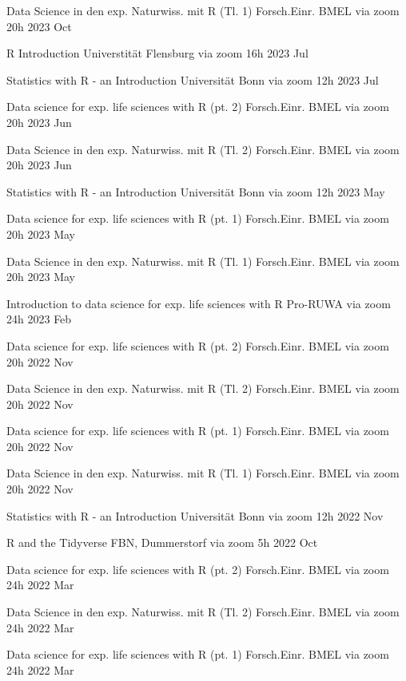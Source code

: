 \documentclass[11pt,a4paper,]{awesome-cv}
\begin{document}
\begin{cvhonors}
\cvhonor
{Data Science in den exp. Naturwiss. mit R (Tl. 1)  }
{Forsch.Einr. BMEL via zoom}
{20h}
{2023 Oct  }

\cvhonor
{R Introduction  }
{Universtität Flensburg via zoom}
{16h}
{2023 Jul  }

\cvhonor
{Statistics with R - an Introduction  }
{Universität Bonn via zoom}
{12h}
{2023 Jul  }

\cvhonor
{Data science for exp. life sciences with R (pt. 2)  }
{Forsch.Einr. BMEL via zoom}
{20h}
{2023 Jun  }

\cvhonor
{Data Science in den exp. Naturwiss. mit R (Tl. 2)  }
{Forsch.Einr. BMEL via zoom}
{20h}
{2023 Jun  }

\cvhonor
{Statistics with R - an Introduction  }
{Universität Bonn via zoom}
{12h}
{2023 May  }

\cvhonor
{Data science for exp. life sciences with R (pt. 1)  }
{Forsch.Einr. BMEL via zoom}
{20h}
{2023 May  }

\cvhonor
{Data Science in den exp. Naturwiss. mit R (Tl. 1)  }
{Forsch.Einr. BMEL via zoom}
{20h}
{2023 May  }

\cvhonor
{Introduction to data science for exp. life sciences with R  }
{Pro-RUWA via zoom}
{24h}
{2023 Feb  }

\cvhonor
{Data science for exp. life sciences with R (pt. 2)  }
{Forsch.Einr. BMEL via zoom}
{20h}
{2022 Nov  }

\cvhonor
{Data Science in den exp. Naturwiss. mit R (Tl. 2)  }
{Forsch.Einr. BMEL via zoom}
{20h}
{2022 Nov  }

\cvhonor
{Data science for exp. life sciences with R (pt. 1)  }
{Forsch.Einr. BMEL via zoom}
{20h}
{2022 Nov  }

\cvhonor
{Data Science in den exp. Naturwiss. mit R (Tl. 1)  }
{Forsch.Einr. BMEL via zoom}
{20h}
{2022 Nov  }

\cvhonor
{Statistics with R - an Introduction  }
{Universität Bonn via zoom}
{12h}
{2022 Nov  }

\cvhonor
{R and the {Tidyverse}  }
{FBN, Dummerstorf via zoom}
{5h}
{2022 Oct  }

\cvhonor
{Data science for exp. life sciences with R (pt. 2)  }
{Forsch.Einr. BMEL via zoom}
{24h}
{2022 Mar  }

\cvhonor
{Data Science in den exp. Naturwiss. mit R (Tl. 2)  }
{Forsch.Einr. BMEL via zoom}
{24h}
{2022 Mar  }

\cvhonor
{Data science for exp. life sciences with R (pt. 1)  }
{Forsch.Einr. BMEL via zoom}
{24h}
{2022 Mar  }


\end{cvhonors}
\end{document}
